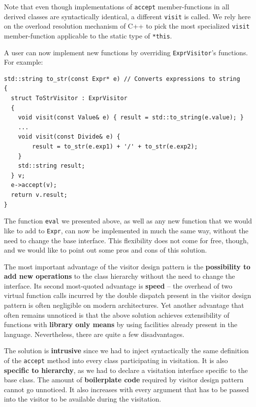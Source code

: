 \documentclass[preprint]{sigplanconf}
\makeatletter
\DeclareRobustCommand{\code}[1]{{\lstinline[breaklines=false,escapechar=@]{#1}}}
\makeatother
\begin{document}
\noindent
Note that even though implementations of \code{accept} member-functions in all 
derived classes are syntactically identical, a different \code{visit} is called. 
We rely here on the overload resolution mechanism of C++ to pick the most 
specialized \code{visit} member-function applicable to the static type of 
\code{*this}.


A user can now implement new functions by overriding \code{ExprVisitor}'s 
functions. For example:

\begin{lstlisting}
std::string to_str(const Expr* e) // Converts expressions to string
{
  struct ToStrVisitor : ExprVisitor
  {
    void visit(const Value& e) { result = std::to_string(e.value); }
    ...
    void visit(const Divide& e) { 
        result = to_str(e.exp1) + '/' + to_str(e.exp2); 
    }
    std::string result;
  } v;
  e->accept(v);
  return v.result;
}
\end{lstlisting}

\noindent
The function \code{eval} we presented above, as well as any new function that we 
would like to add to \code{Expr}, can now be implemented in much the same way, 
without the need to change the base interface. This flexibility does not come for free, 
though, and we would like to point out some pros and cons of this solution.

The most important advantage of the visitor design pattern is the {\bf possibility 
to add new operations} to the class hierarchy without the need to change 
the interface. Its second most-quoted advantage is {\bf speed} -- the 
overhead of two virtual function calls incurred by the double  
dispatch present in the visitor design pattern is often negligible on modern 
architectures. Yet another advantage that often remains unnoticed is that the 
above solution achieves extensibility of functions with {\bf library only means} 
by using facilities already present in the language. Nevertheless, there are 
quite a few disadvantages.

The solution is {\bf intrusive} since we had to inject syntactically the same 
definition of the \code{accept} method into every class participating in visitation. 
It is also {\bf specific to hierarchy}, as we had to declare a visitation 
interface specific to the base class. The amount of {\bf boilerplate code} 
required by visitor design pattern cannot go unnoticed. It also increases with 
every argument that has to be passed into the visitor to be available during the 
visitation.
\end{document}
